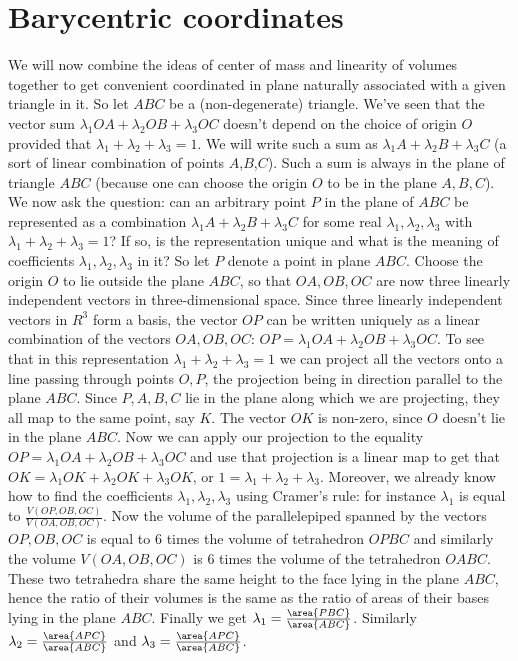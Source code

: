 \section{Barycentric coordinates}
We will now combine the ideas of center of mass and linearity of volumes together to get convenient coordinated in plane naturally associated with a given triangle in it.
So let $ABC$ be a (non-degenerate) triangle. We've seen that the vector sum $\lambda_1 OA + \lambda_2 OB + \lambda_3 OC$ doesn't depend on the choice of origin $O$ provided that $\lambda_1+\lambda_2+\lambda_3=1$. We will write such a sum as $\lambda_1 A + \lambda_2 B+\lambda_3 C$ (a sort of linear combination of points $A$,$B$,$C$). Such a sum is always in the plane of triangle $ABC$ (because one can choose the origin $O$ to be in the plane $A,B,C$). We now ask the question: can an arbitrary point $P$ in the plane of $ABC$ be represented as a combination $\lambda_1 A + \lambda_2 B+\lambda_3 C$ for some real $\lambda_1,\lambda_2,\lambda_3$ with $\lambda_1+\lambda_2+\lambda_3=1$? If so, is the representation unique and what is the meaning of coefficients $\lambda_1,\lambda_2,\lambda_3$ in it?
So let $P$ denote a point in plane $ABC$. Choose the origin $O$ to lie outside the plane $ABC$, so that $OA, OB, OC$ are now three linearly independent vectors in three-dimensional space. Since three linearly independent vectors in $R^3$ form a basis, the vector $OP$ can be written uniquely as a linear combination of the vectors $OA, OB, OC$: $OP=\lambda_1 OA + \lambda_2 OB+\lambda_3 OC$. To see that in this representation $\lambda_1 + \lambda_2+\lambda_3=1$ we can project all the vectors onto a line passing through points $O,P$, the projection being in direction parallel to the plane $ABC$. Since $P,A,B,C$ lie in the plane along which we are projecting, they all map to the same point, say $K$. The vector $OK$ is non-zero, since $O$ doesn't lie in the plane $ABC$. Now we can apply our projection to the equality $OP=\lambda_1 OA + \lambda_2 OB+\lambda_3 OC$ and use that projection is a linear map to get that $OK=\lambda_1 OK + \lambda_2 OK+\lambda_3 OK$, or $1=\lambda_1 + \lambda_2 +\lambda_3$.
Moreover, we already know how to find the coefficients $\lambda_1,\lambda_2,\lambda_3$ using Cramer's rule: for instance $\lambda_1$ is equal to $\frac{V(OP,OB,OC)}{V(OA,OB,OC)}$. Now the volume of the parallelepiped spanned by the vectors $OP,OB,OC$ is equal to 6 times the volume of tetrahedron $OPBC$ and similarly the volume $V(OA,OB,OC)$ is 6 times the volume of the tetrahedron $OABC$. These two tetrahedra share the same height to the face lying in the plane $ABC$, hence the ratio of their volumes is the same as the ratio of areas of their bases lying in the plane $ABC$. Finally we get $\lambda_1=\frac{\area{PBC}}{\area{ABC}}$. Similarly $\lambda_2=\frac{\area{APC}}{\area{ABC}}$ and $\lambda_3=\frac{\area{APC}}{\area{ABC}}$.

